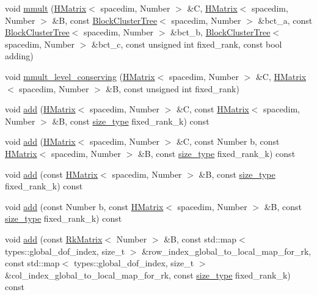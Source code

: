 \begin{DoxyCompactItemize}
\item 
void \hyperlink{classHMatrix_a4139e9069e3b18d4719c527ce2e0414c}{mmult} (\hyperlink{classHMatrix}{H\+Matrix}$<$ spacedim, Number $>$ \&C, \hyperlink{classHMatrix}{H\+Matrix}$<$ spacedim, Number $>$ \&B, const \hyperlink{classBlockClusterTree}{Block\+Cluster\+Tree}$<$ spacedim, Number $>$ \&bct\+\_\+a, const \hyperlink{classBlockClusterTree}{Block\+Cluster\+Tree}$<$ spacedim, Number $>$ \&bct\+\_\+b, \hyperlink{classBlockClusterTree}{Block\+Cluster\+Tree}$<$ spacedim, Number $>$ \&bct\+\_\+c, const unsigned int fixed\+\_\+rank, const bool adding)
\item 
void \hyperlink{classHMatrix_a4ea0317bff2670e3ed7e48416f908873}{mmult\+\_\+level\+\_\+conserving} (\hyperlink{classHMatrix}{H\+Matrix}$<$ spacedim, Number $>$ \&C, \hyperlink{classHMatrix}{H\+Matrix}$<$ spacedim, Number $>$ \&B, const unsigned int fixed\+\_\+rank)
\item 
void \hyperlink{classHMatrix_a8f96186426cd3147d5af32ca84ad25ea}{add} (\hyperlink{classHMatrix}{H\+Matrix}$<$ spacedim, Number $>$ \&C, const \hyperlink{classHMatrix}{H\+Matrix}$<$ spacedim, Number $>$ \&B, const \hyperlink{classHMatrix_a5ca8dc549783d38371a01ecd621ecb34}{size\+\_\+type} fixed\+\_\+rank\+\_\+k) const
\item 
void \hyperlink{classHMatrix_aea42f5112b88270fef73342853fa386d}{add} (\hyperlink{classHMatrix}{H\+Matrix}$<$ spacedim, Number $>$ \&C, const Number b, const \hyperlink{classHMatrix}{H\+Matrix}$<$ spacedim, Number $>$ \&B, const \hyperlink{classHMatrix_a5ca8dc549783d38371a01ecd621ecb34}{size\+\_\+type} fixed\+\_\+rank\+\_\+k) const
\item 
void \hyperlink{classHMatrix_a9bd48ada567962ab0dc75c31986bd1a6}{add} (const \hyperlink{classHMatrix}{H\+Matrix}$<$ spacedim, Number $>$ \&B, const \hyperlink{classHMatrix_a5ca8dc549783d38371a01ecd621ecb34}{size\+\_\+type} fixed\+\_\+rank\+\_\+k) const
\item 
void \hyperlink{classHMatrix_af42aaa86b9f47c5c1514e4f06e343db6}{add} (const Number b, const \hyperlink{classHMatrix}{H\+Matrix}$<$ spacedim, Number $>$ \&B, const \hyperlink{classHMatrix_a5ca8dc549783d38371a01ecd621ecb34}{size\+\_\+type} fixed\+\_\+rank\+\_\+k) const
\item 
void \hyperlink{classHMatrix_a1793dff400aeae649f909d7f45db8b8a}{add} (const \hyperlink{classRkMatrix}{Rk\+Matrix}$<$ Number $>$ \&B, const std\+::map$<$ types\+::global\+\_\+dof\+\_\+index, size\+\_\+t $>$ \&row\+\_\+index\+\_\+global\+\_\+to\+\_\+local\+\_\+map\+\_\+for\+\_\+rk, const std\+::map$<$ types\+::global\+\_\+dof\+\_\+index, size\+\_\+t $>$ \&col\+\_\+index\+\_\+global\+\_\+to\+\_\+local\+\_\+map\+\_\+for\+\_\+rk, const \hyperlink{classHMatrix_a5ca8dc549783d38371a01ecd621ecb34}{size\+\_\+type} fixed\+\_\+rank\+\_\+k) const

\end{DoxyCompactItemize}
